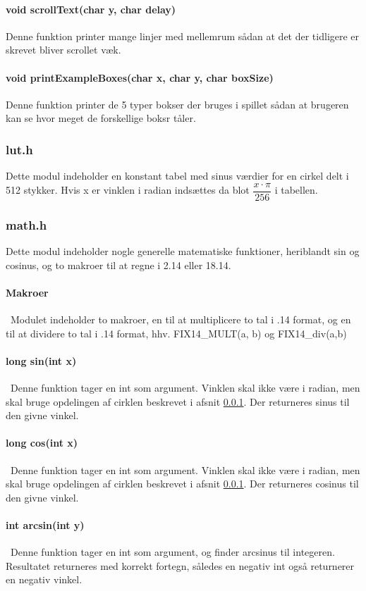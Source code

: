 \paragraph{void scrollText(char y, char delay)}
Denne funktion printer mange linjer med mellemrum sådan at det der tidligere er skrevet bliver scrollet væk.

\paragraph{void printExampleBoxes(char x, char y, char boxSize)}
Denne funktion printer de 5 typer bokser der bruges i spillet sådan at brugeren kan se hvor meget de forskellige boksr tåler.

\subsubsection{lut.h}
\label{lut}
Dette modul indeholder en konstant tabel med sinus værdier for en cirkel delt i 512 stykker. Hvis x er vinklen i radian indsættes da blot $\dfrac{x\cdot \pi}{256}$ i tabellen.
\subsubsection{math.h}
Dette modul indeholder nogle generelle matematiske funktioner, heriblandt sin og cosinus, og to makroer til at regne i 2.14 eller 18.14.
\paragraph{Makroer}\
Modulet indeholder to makroer, en til at multiplicere to tal i .14 format, og en til at dividere to tal i .14 format, hhv. FIX14\_MULT(a, b) og FIX14\_div(a,b)

\paragraph{long sin(int x)}\
Denne funktion tager en int som argument. Vinklen skal ikke være i radian, men skal bruge opdelingen af cirklen beskrevet i afsnit \ref{lut}. Der returneres sinus til den givne vinkel.
\paragraph{long cos(int x)}\
Denne funktion tager en int som argument. Vinklen skal ikke være i radian, men skal bruge opdelingen af cirklen beskrevet i afsnit \ref{lut}. Der returneres cosinus til den givne vinkel.
\paragraph{int arcsin(int y)}\
Denne funktion tager en int som argument, og finder arcsinus til integeren. Resultatet returneres med korrekt fortegn, således en negativ int også returnerer en negativ vinkel.
